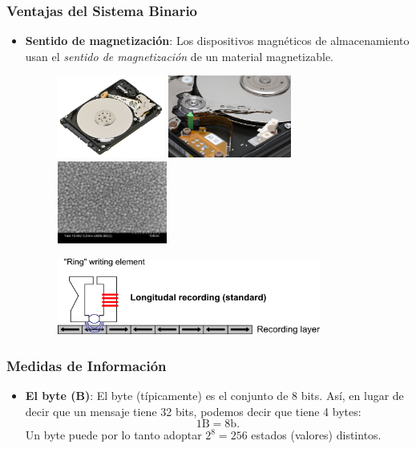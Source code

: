 \documentclass[aspectratio=169]{beamer}
\begin{document}
\begin{frame}[fragile]\frametitle{Ventajas del Sistema Binario}
\begin{itemize}
	\item \textbf{Sentido de magnetización}: Los dispositivos magnéticos de almacenamiento usan el \textit{sentido de magnetización} de un material magnetizable.
	\begin{figure}
		\begin{center}
		\includegraphics[height=2.7cm]{figs/1280px-Laptop-hard-drive-exposed.jpg}	\includegraphics[height=2.7cm]{figs/1280px-Hard_disk_platters_and_head.jpg}\hspace{0.3cm}\includegraphics[height=2.7cm]{figs/HardDrivesGrainsSEM100nm-300x225.jpg}
		\end{center}
		\end{figure}
		\begin{figure}
			\begin{center}
			\includegraphics[height=2.5cm]{figs/Recording_Diagram.png}
			\end{center}
			\end{figure}
\end{itemize}
\end{frame}
\begin{frame}[fragile]\frametitle{Medidas de Información}
\begin{itemize}
\item \textbf{El byte (B)}: El byte (típicamente) es el conjunto de 8 bits. Así, en lugar de decir que un mensaje tiene 32 bits, podemos decir que tiene 4 bytes:
$$
1 \text{B} = 8 \text{b}.
$$
Un byte puede por lo tanto adoptar $2^8=256$ estados (valores) distintos. 
\end{itemize}
\end{frame}
\end{document}
